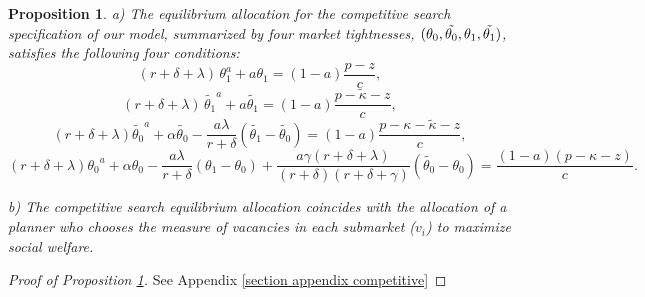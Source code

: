 \documentclass[12pt]{article} %
\newtheorem{proposition}{Proposition}
\theoremstyle{definition}
\begin{document}
\begin{proposition}\label{proposition competitive}
a) The equilibrium allocation for the competitive search specification of our model, summarized by four market tightnesses, $(\theta_0, \Tilde{\theta_0}, \theta_1, \Tilde{\theta_1})$, satisfies the following four conditions: 
\begin{equation}\label{eq theta 1}
   (r+\delta +\lambda)\,\theta_1^a + a\theta_1 = (1-a) \frac{p-z}{c},    
\end{equation}
\begin{equation}\label{eq theta 1 tilde}
   (r+\delta +\lambda)\,\tilde{\theta_1}^a + a\tilde{\theta_1} = (1-a) \frac{p-\tilde{\kappa}-z}{c},
\end{equation}
\begin{equation}\label{eq theta 0 tilde}
   (r+\delta+\lambda)\tilde{\theta_0}^a +\alpha \tilde{\theta_0} - \frac{a \lambda}{r+\delta}(\tilde{\theta_1}-\tilde{\theta_0}) =(1-a)\frac{p-\kappa-\tilde{\kappa}-z}{c},  
\end{equation}
\begin{equation}\label{eq theta 0}
 (r+\delta+\lambda){\theta_0}^a +\alpha {\theta_0} -\frac{a \lambda}{r+\delta}({\theta_1}-{\theta_0})+\frac{ a\gamma(r+\delta+\lambda)}{(r+\delta)(r+\delta +\gamma)}(\tilde{\theta_0}-\theta_0) = \frac{(1-a)(p-\kappa-z)}{c}. 
\end{equation}

b) The competitive search equilibrium allocation coincides with the allocation of a planner who chooses the measure of vacancies in each submarket ($v_i$) to maximize social welfare. 


\end{proposition}
\begin{proof}[Proof of Proposition \ref{proposition competitive}]
See Appendix \ref{section appendix competitive}
\end{proof}
\end{document}
